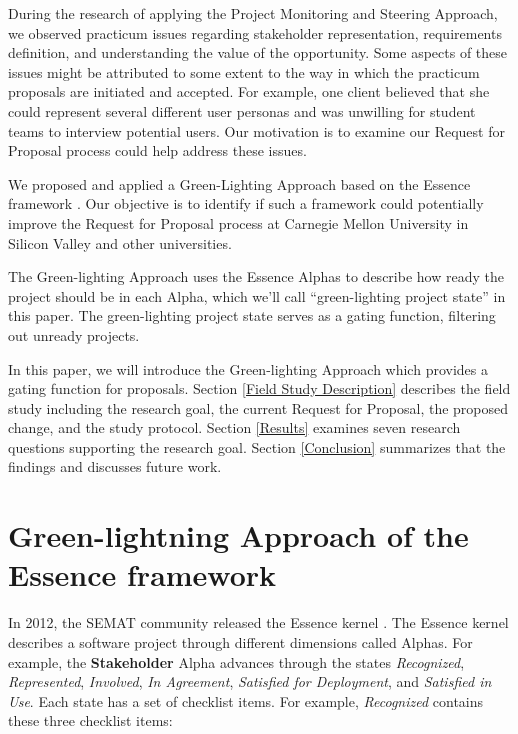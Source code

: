\documentclass[conference]{IEEEtran}
\begin{document}
During the research of applying the Project Monitoring and Steering
Approach, we observed practicum issues regarding stakeholder
representation, requirements definition, and understanding the value of the opportunity. Some aspects of these issues might be attributed to some extent to the way in which the practicum proposals are initiated and accepted. For example, one client believed that she could represent several different user personas and was unwilling for student teams to interview potential users. Our motivation is to examine our Request for Proposal process could help address these issues.

We proposed and applied a Green-Lighting Approach based on the Essence framework \cite{EssenceBook}. Our objective is to identify if such a framework could potentially improve the Request for Proposal process at Carnegie Mellon University in Silicon Valley and other universities.

The Green-lighting Approach
uses the Essence Alphas to describe how ready the project should be in
each Alpha, which we'll call ``green-lighting project state'' in this
paper. The green-lighting project state serves as a gating function,
filtering out unready projects.

In this paper, we will introduce the Green-lighting Approach which
provides a gating function for proposals. Section
\ref{Field Study Description} describes the field study
including the research goal, the current Request for Proposal, the
proposed change, and the study protocol. Section
\ref{Results} examines seven research questions
supporting the research goal. Section \ref{Conclusion}
summarizes that the findings and discusses future work.


\section{Green-lightning Approach of the Essence framework}
\label{Green-lightning Approach of the Essence framework}

In 2012, the SEMAT community released the Essence kernel
\cite{OMGStandard}. The Essence kernel describes a
software project through different dimensions called Alphas. For
example, the \textbf{Stakeholder} Alpha advances through the states
\textit{Recognized}, \textit{Represented}, \textit{Involved}, 
\textit{In Agreement}, \textit{Satisfied for Deployment}, and \textit{Satisfied in Use}. Each state has a set of checklist items. For example, \textit{Recognized} contains these three checklist items:
\end{document}
